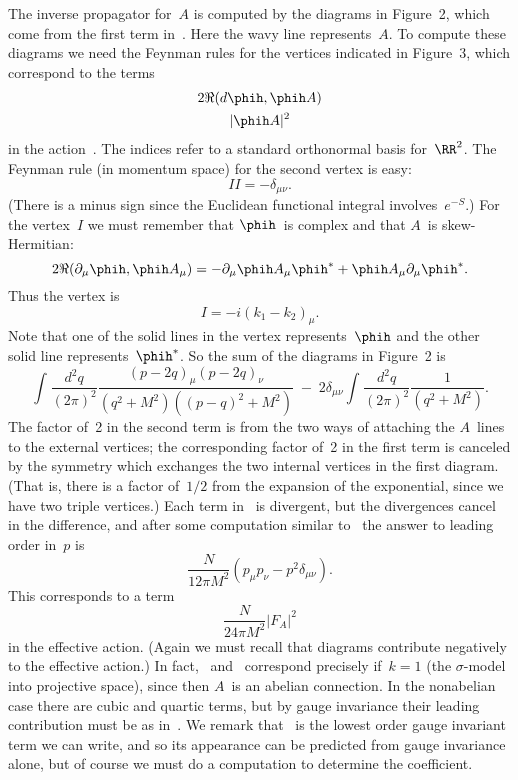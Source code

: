  \midinsert
 \bigskip
 \centerline{
  \epsfxsize=300pt
  \epsfysize=80pt
 }
 \nobreak
 \endcaption
 \bigskip
 \endinsert


 \midinsert
 \bigskip
 \centerline{
  \epsfxsize=250pt
  \epsfysize=130pt
 }
 \nobreak
 \endcaption
 \bigskip
 \endinsert


The inverse propagator for~$A$ is computed by the diagrams in Figure~2, which
come from the first term in~.  Here the wavy line represents~$A$.
To compute these diagrams we need the Feynman rules for the vertices
indicated in Figure~3, which correspond to the terms  
  $$ \gathered
      2\Re(d\phih,\phih A) \\ 
      |\phih A|^2\endgathered  $$
in the action~.  The indices refer to a standard orthonormal basis
for~$\RR^2$.  The Feynman rule (in momentum space) for the second vertex is
easy:
  $$ II=-\delta _{\mu \nu }.  $$
(There is a minus sign since the Euclidean functional integral
involves~$e^{-S}$.)  For the vertex~$I$ we must remember that $\phih$~is
complex and that $A$~is skew-Hermitian: 
  $$ 2\Re(\partial _\mu \phih,\phih A_\mu ) = -\partial _\mu \phih A_{\mu
     }\phih^* + \phih A_\mu \partial _\mu \phih^*. $$ 
Thus the vertex is 
  $$ I = -i(k_1 - k_2)_\mu .  $$
Note that one of the solid lines in the vertex represents~$\phih$ and the
other solid line represents~$\phih^*$.  So the sum of the diagrams in
Figure~2 is 
  $$ \int_{}\frac{d^2q}{(2\pi)^2 } \frac{(p-2q)_\mu (p-2q)_{\nu }}{(q^2 +
     M^2)((p-q)^2+M^2)} \;-\;2\delta _{\mu \nu } \int_{}\frac{d^2q}{(2\pi)^2
     } \frac{1}{(q^2 + M^2)}. \tag{17} $$
The factor of~2 in the second term is from the two ways of attaching the
$A$~lines to the external vertices; the corresponding factor of~2 in the
first term is canceled by the symmetry which exchanges the two internal
vertices in the first diagram.  (That is, there is a factor of~$1/2$ from the
expansion of the exponential, since we have two triple vertices.)  Each term
in~ is divergent, but the divergences cancel in the difference,
and after some computation similar to~ the answer to leading order
in~$p$ is
  $$ \frac{N}{12\pi M^2}(p_{\mu} p_\nu - p^2\delta _{\mu \nu }). \tag{18} $$
This corresponds to a term 
  $$ \frac{N}{24\pi M^2} |F_A|^2 \tag{19} $$
in the effective action.  (Again we must recall that diagrams contribute
negatively to the effective action.)  In fact, ~and
~correspond precisely if~$k=1$ (the $\sigma $-model into
projective space), since then $A$~is an abelian connection.  In the
nonabelian case there are cubic and quartic terms, but by gauge invariance
their leading contribution must be as in~.  We remark that
~is the lowest order gauge invariant term we can write, and so its
appearance can be predicted from gauge invariance alone, but of course we
must do a computation to determine the coefficient.
 
